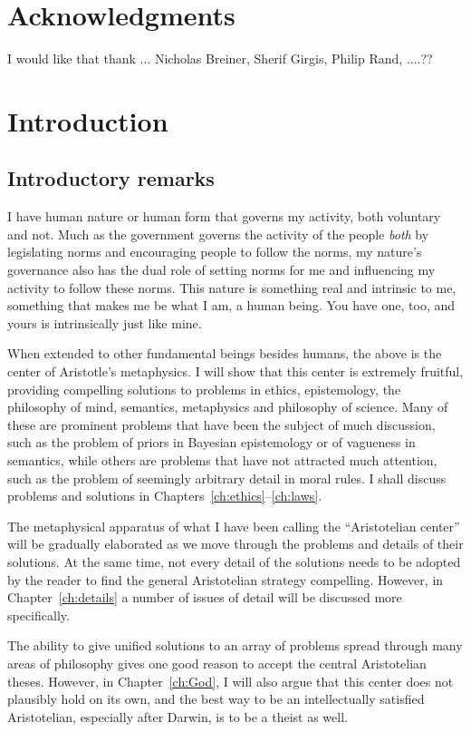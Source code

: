 \def\mychapter{I}

\chapter*{Acknowledgments}
I would like that thank ... Nicholas Breiner, Sherif Girgis, Philip Rand, ....??

\chapter{Introduction}\label{ch:intro}
\section{Introductory remarks}
I have human nature or human form that governs my activity, both voluntary and not.
Much as the government governs the activity of the people \textit{both} by legislating norms and encouraging
people to follow the norms, my nature's governance also has the dual role of setting norms for me and influencing my
activity to follow these norms. This nature is something real and intrinsic to me, something that makes me be what I am, 
a human being. You have one, too, and yours is intrinsically just like mine.

When extended to other fundamental beings besides humans, the above is the center of Aristotle's metaphysics.
I will show that this center is extremely fruitful, providing compelling solutions to problems in ethics,
epistemology, the philosophy of mind, semantics, metaphysics and philosophy of science. Many of these are prominent problems that have been
the subject of much discussion, such as the problem of priors in Bayesian epistemology or of vagueness in semantics, while others 
are problems
that have not attracted much attention, such as the problem of seemingly arbitrary detail in moral rules. 
I shall discuss problems and solutions in Chapters~\ref{ch:ethics}--\ref{ch:laws}.

The metaphysical apparatus of what I have been calling the ``Aristotelian center'' will be gradually elaborated
as we move through the problems and details of their solutions. At the same time, not every detail of the solutions needs to be
adopted by the reader to find the general Aristotelian strategy compelling. However, in Chapter~\ref{ch:details} a number of 
issues of detail will be discussed more specifically.

The ability to give unified solutions to an array of problems spread through many areas of philosophy gives one
good reason to accept the central Aristotelian theses. However, in Chapter~\ref{ch:God}, I will also argue that this center does
not plausibly hold on its own, and the best way to be an intellectually satisfied Aristotelian, especially after Darwin, is to be a theist 
as well.

